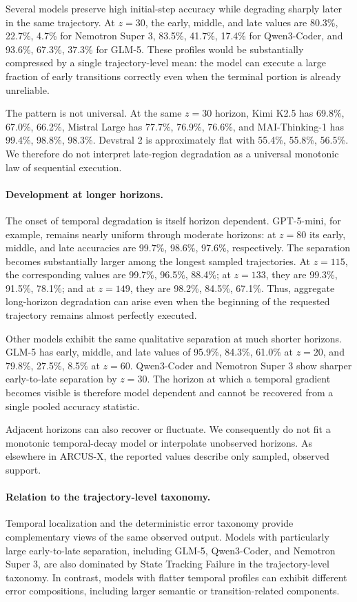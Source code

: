 \documentclass{article}
\begin{document}
Several models preserve high initial-step accuracy while degrading sharply later in the same trajectory. At $z=30$, the early, middle, and late values are 80.3\%, 22.7\%, 4.7\% for Nemotron Super 3, 83.5\%, 41.7\%, 17.4\% for Qwen3-Coder, and 93.6\%, 67.3\%, 37.3\% for GLM-5. These profiles would be substantially compressed by a single trajectory-level mean: the model can execute a large fraction of early transitions correctly even when the terminal portion is already unreliable.

The pattern is not universal. At the same $z=30$ horizon, Kimi K2.5 has 69.8\%, 67.0\%, 66.2\%, Mistral Large has 77.7\%, 76.9\%, 76.6\%, and MAI-Thinking-1 has 99.4\%, 98.8\%, 98.3\%. Devstral 2 is approximately flat with 55.4\%, 55.8\%, 56.5\%. We therefore do not interpret late-region degradation as a universal monotonic law of sequential execution.

\paragraph{Development at longer horizons.}
The onset of temporal degradation is itself horizon dependent. GPT-5-mini, for example, remains nearly uniform through moderate horizons: at $z=80$ its early, middle, and late accuracies are 99.7\%, 98.6\%, 97.6\%, respectively. The separation becomes substantially larger among the longest sampled trajectories. At $z=115$, the corresponding values are 99.7\%, 96.5\%, 88.4\%; at $z=133$, they are 99.3\%, 91.5\%, 78.1\%; and at $z=149$, they are 98.2\%, 84.5\%, 67.1\%. Thus, aggregate long-horizon degradation can arise even when the beginning of the requested trajectory remains almost perfectly executed.

Other models exhibit the same qualitative separation at much shorter horizons. GLM-5 has early, middle, and late values of 95.9\%, 84.3\%, 61.0\% at $z=20$, and 79.8\%, 27.5\%, 8.5\% at $z=60$. Qwen3-Coder and Nemotron Super 3 show sharper early-to-late separation by $z=30$. The horizon at which a temporal gradient becomes visible is therefore model dependent and cannot be recovered from a single pooled accuracy statistic.

Adjacent horizons can also recover or fluctuate. We consequently do not fit a monotonic temporal-decay model or interpolate unobserved horizons. As elsewhere in ARCUS-X, the reported values describe only sampled, observed support.

\paragraph{Relation to the trajectory-level taxonomy.}
Temporal localization and the deterministic error taxonomy provide
complementary views of the same observed output. Models with particularly
large early-to-late separation, including GLM-5, Qwen3-Coder, and Nemotron
Super 3, are also dominated by State Tracking Failure in the trajectory-level
taxonomy. In contrast, models with flatter temporal profiles can exhibit
different error compositions, including larger semantic or transition-related
components.
\end{document}
